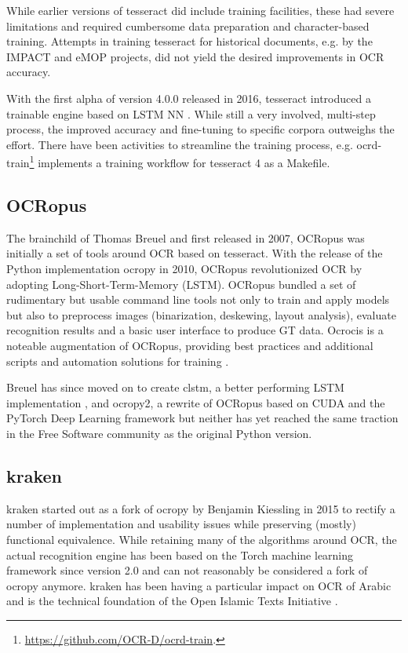 \documentclass[sigconf]{acmart}
\begin{document}
While earlier versions of tesseract did include training facilities, 
these had severe limitations and required cumbersome data preparation and
character-based training. Attempts in training tesseract for historical documents, e.g.
by the IMPACT \cite{PSNC} and eMOP \cite{doi:10.1093/llc/fqv062} projects, did not yield 
the desired improvements in OCR accuracy.

With the first alpha of version 4.0.0 released in 2016, tesseract introduced a trainable
engine based on LSTM NN \cite{smith2016tesseract}. While still a very involved, multi-step process, the
improved accuracy and fine-tuning to specific corpora outweighs the effort.
There have been activities to streamline the training process, e.g.
ocrd-train\footnote{\url{https://github.com/OCR-D/ocrd-train}.} implements a training workflow for
tesseract 4 as a Makefile.

\subsection{OCRopus}

The brainchild of Thomas Breuel and first released in 2007, OCRopus
\cite{breuel} was initially a set of tools around OCR based on
tesseract. With the release of the Python implementation ocropy in
2010, OCRopus revolutionized OCR by adopting
Long-Short-Term-Memory (LSTM). OCRopus bundled a set of rudimentary but
usable command line tools not only to train and apply models but
also to preprocess images (binarization, deskewing, layout analysis),
evaluate recognition results and a basic user interface to produce
GT data. Ocrocis is a noteable augmentation of OCRopus, providing best practices and
additional scripts and automation solutions for training \cite{springmann2015ocrocis}.

Breuel has since moved on to create clstm, a better
performing LSTM implementation \cite{DBLP:conf/icdar/Breuel17}, and
ocropy2, a rewrite of OCRopus based on CUDA and the PyTorch Deep
Learning framework \cite{DBLP:conf/icdar/Breuel17} but neither has
yet reached the same traction in the Free Software community as the
original Python version.


\subsection{kraken}

kraken \cite{DBLP:journals/corr/RomanovMSK17} started out as a fork of ocropy
by Benjamin Kiessling in 2015 to rectify a number of implementation and usability
issues while preserving (mostly) functional equivalence. While retaining many of
the algorithms around OCR, the actual recognition engine has been based on the
Torch machine learning framework since version 2.0 and can not reasonably be
considered a fork of ocropy anymore. kraken has been having a particular impact
on OCR of Arabic and is the technical foundation of the Open Islamic Texts
Initiative \cite{miller_romanov_savant_2018}.
\end{document}
